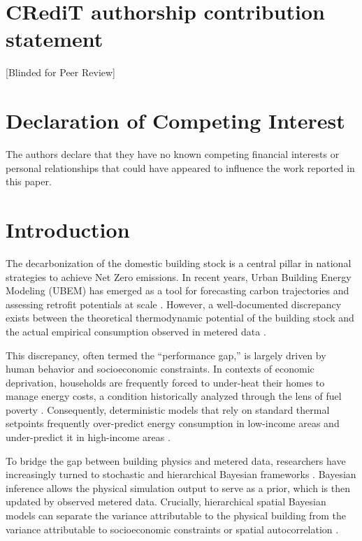 \documentclass[11pt, a4paper, twocolumn, numbers]{elsarticle}
\begin{document}
\begin{frontmatter}
\section*{CRediT authorship contribution statement}
[Blinded for Peer Review]

\section*{Declaration of Competing Interest}
The authors declare that they have no known competing financial interests or personal relationships that could have appeared to influence the work reported in this paper.

\end{frontmatter}

\section{Introduction}\label{introduction}

The decarbonization of the domestic building stock is a central pillar in national strategies to achieve Net Zero emissions. In recent years, Urban Building Energy Modeling (UBEM) has emerged as a tool for forecasting carbon trajectories and assessing retrofit potentials at scale \cite{Chen2017, Reinhart2016}. However, a well-documented discrepancy exists between the theoretical thermodynamic potential of the building stock and the actual empirical consumption observed in metered data \cite{Hong2009, Lutzenhiser2009}. 

This discrepancy, often termed the ``performance gap,'' is largely driven by human behavior and socioeconomic constraints. In contexts of economic deprivation, households are frequently forced to under-heat their homes to manage energy costs, a condition historically analyzed through the lens of fuel poverty \cite{Boardman1991, Hills2012}. Consequently, deterministic models that rely on standard thermal setpoints frequently over-predict energy consumption in low-income areas and under-predict it in high-income areas \cite{Ward2019}. 

To bridge the gap between building physics and metered data, researchers have increasingly turned to stochastic and hierarchical Bayesian frameworks \cite{Booth2013, petrou2024bayesian}. Bayesian inference allows the physical simulation output to serve as a prior, which is then updated by observed metered data. Crucially, hierarchical spatial Bayesian models can separate the variance attributable to the physical building from the variance attributable to socioeconomic constraints or spatial autocorrelation \cite{NetoBradley2021}. 
\end{document}
